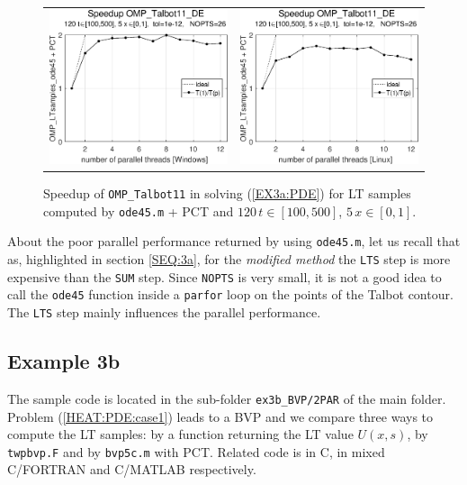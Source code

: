 \documentclass[a4paper,10pt]{report}%
\begin{document}
\begin{figure}[htb]
\centering
\begin{tabular}{cc} %
\includegraphics[height=0.2\textwidth]{./FIGS/EX3a/EX3a_ode45_speedup_11_Windows.eps} &
\includegraphics[height=0.2\textwidth]{./FIGS/EX3a/EX3a_ode45_speedup_11_Linux.eps}
\end{tabular}
\caption{\small Speedup of {\tt OMP\_Talbot11} in solving (\ref{EX3a:PDE}) for LT samples computed by
{\tt ode45.m} + PCT and $120\,t\in[100,500]$, $5\,x\in[0,1]$.}
\label{PAR_EX3a_speedup_ode45}
\end{figure}

\noindent About the poor parallel performance returned by using {\tt ode45.m}, let us recall that as, highlighted
in section \ref{SEQ:3a}, for the {\em modified method} the {\tt LTS} step is more expensive than the {\tt SUM}
step. Since {\tt NOPTS} is very small, it is not a good idea to call the {\tt ode45} function inside a {\tt parfor}
loop on the points of the Talbot contour.
The {\tt LTS} step mainly influences the parallel performance.



\subsection{Example 3b}
The sample code is located in the sub-folder {\tt ex3b\_BVP/2PAR} of the main folder.
\\
Problem (\ref{HEAT:PDE:case1}) leads to a BVP and we compare three ways to compute the LT samples: by a function
returning the LT value $U(x,s)$, by {\tt twpbvp.F} and by {\tt bvp5c.m} with PCT. Related code is in C, in mixed
C/FORTRAN and C/MATLAB respectively.
\end{document}
